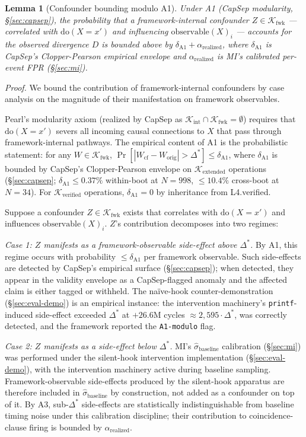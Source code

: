 \documentclass[conference]{IEEEtran}
\newtheorem{lemma}{Lemma}
\newcommand{\Kverified}{\mathcal{K}_\text{verified}}
\newcommand{\Kextended}{\mathcal{K}_\text{extended}}
\newcommand{\Kint}{\mathcal{K}_\text{int}}
\newcommand{\Kfwk}{\mathcal{K}_\text{fwk}}
\newcommand{\sigbase}{\hat{\sigma}_\text{baseline}}
\newcommand{\Dstar}{\Delta^{*}}
\newcommand{\arealized}{\alpha_\text{realized}}
\newcommand{\dox}[1]{\text{do}(X{=}#1)}
\begin{document}
\begin{lemma}[Confounder bounding modulo A1]
\label{lem:confounder}
Under A1 (CapSep modularity, \S\ref{sec:capsep}), the probability
that a framework-internal confounder $Z \in \Kfwk$ --- correlated
with $\dox{x'}$ and influencing $\text{observable}(X)_i$ ---
accounts for the observed divergence $D$ is bounded above by
$\delta_{\text{A1}} + \arealized$, where $\delta_{\text{A1}}$ is
CapSep's Clopper-Pearson empirical envelope and $\arealized$ is
MI's calibrated per-event FPR (\S\ref{sec:mi}).
\end{lemma}

\textit{Proof.} We bound the contribution of framework-internal
confounders by case analysis on the magnitude of their
manifestation on framework observables.

Pearl's modularity axiom (realized by CapSep as
$\Kint \cap \Kfwk = \emptyset$) requires that $\dox{x'}$ severs
all incoming causal connections to $X$ that pass through
framework-internal pathways. The empirical content of A1 is the
probabilistic statement: for any $W \in \Kfwk$,
$\Pr[|W_{\text{cf}} - W_{\text{orig}}| > \Dstar] \leq
\delta_{\text{A1}}$, where $\delta_{\text{A1}}$ is bounded by
CapSep's Clopper-Pearson envelope on $\Kextended$ operations
(\S\ref{sec:capsep}; $\delta_{\text{A1}} \leq 0.37\%$ within-boot
at $N{=}998$, $\leq 10.4\%$ cross-boot at $N{=}34$). For
$\Kverified$ operations, $\delta_{\text{A1}} = 0$ by inheritance
from L4.verified.

Suppose a confounder $Z \in \Kfwk$ exists that correlates with
$\dox{x'}$ and influences $\text{observable}(X)_i$. $Z$'s
contribution decomposes into two regimes:

\emph{Case 1: $Z$ manifests as a framework-observable side-effect
above $\Dstar$.} By A1, this regime occurs with probability
$\leq \delta_{\text{A1}}$ per framework observable. Such
side-effects are detected by CapSep's empirical surface
(\S\ref{sec:capsep}); when detected, they appear in the validity
envelope as a CapSep-flagged anomaly and the affected claim is
either tagged or withheld. The naïve-hook counter-demonstration
(\S\ref{sec:eval-demo}) is an empirical instance: the intervention
machinery's \texttt{printf}-induced side-effect exceeded $\Dstar$
at $+26.6$M cycles $\approx 2{,}595 \cdot \Dstar$, was correctly
detected, and the framework reported the \texttt{A1-modulo} flag.

\emph{Case 2: $Z$ manifests as a side-effect below $\Dstar$.}
MI's $\sigbase$ calibration (\S\ref{sec:mi}) was performed under
the silent-hook intervention implementation (\S\ref{sec:eval-demo}),
with the intervention machinery active during baseline sampling.
Framework-observable side-effects produced by the silent-hook
apparatus are therefore included in $\sigbase$ by construction,
not added as a confounder on top of it. By A3, sub-$\Dstar$
side-effects are statistically indistinguishable from baseline
timing noise under this calibration discipline; their contribution
to coincidence-clause firing is bounded by $\arealized$.
\end{document}
